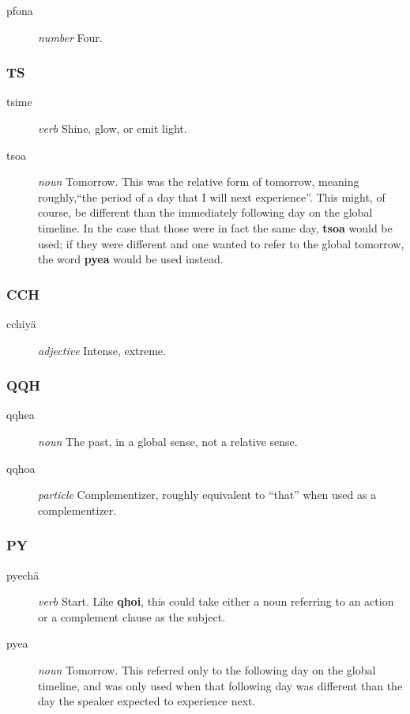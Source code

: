 \documentclass{article}
\begin{document}
\begin{description}
\item [pfona] \emph{number} Four.
\end{description}

\subsubsection{TS}

\begin{description}
\item [tsime] \emph{verb} Shine, glow, or emit light.
\item [tsoa] \emph{noun} Tomorrow.  This was the relative form of tomorrow, meaning roughly,``the period of a day that I will next experience''.  This might, of course, be different than the immediately following day on the global timeline.  In the case that those were in fact the same day, \textbf{tsoa} would be used; if they were different and one wanted to refer to the global tomorrow, the word \textbf{pyea} would be used instead.
\end{description}

\subsubsection{CCH}

\begin{description}
\item [cchiy\"a] \emph{adjective} Intense, extreme.
\end{description}

\subsubsection{QQH}

\begin{description}
\item [qqhea] \emph{noun} The past, in a global sense, not a relative sense.
\item [qqhoa] \emph{particle} Complementizer, roughly equivalent to ``that'' when used as a complementizer.
\end{description}

\subsubsection{PY}

\begin{description}
\item [pyech\"a] \emph{verb} Start.  Like \textbf{qhoi}, this could take either a noun referring to an action or a complement clause as the subject.
\item [pyea] \emph{noun} Tomorrow.  This referred only to the following day on the global timeline, and was only used when that following day was different than the day the speaker expected to experience next.
\end{description}
\end{document}
